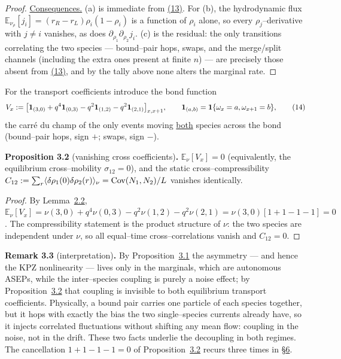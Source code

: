 \documentclass[11pt]{article}
\theoremstyle{plain}
\theoremstyle{definition}
\theoremstyle{remark}
\newcommand{\E}{\mathbb{E}}\newcommand{\PP}{\mathbb{P}}\newcommand{\dd}{\,\mathrm{d}}
\begin{document}
\begin{proof}
\underline{Consequences.} (a) is immediate from \hyperref[eq_jdecouple]{(13)}. For (b), the
hydrodynamic flux $\E_{\nu_\rho}[j_i]=(r_R-r_L)\rho_i(1-\rho_i)$ is a function of
$\rho_i$ alone, so every $\rho_j$--derivative with $j\ne i$ vanishes, as does
$\partial_{\rho_1}\partial_{\rho_2}j_i$. (c) is the residual: the only transitions
correlating the two species --- bound--pair hops, swaps, and the merge/split channels
(including the extra ones present at finite $n$) --- are precisely those absent from
\hyperref[eq_jdecouple]{(13)}, and by the tally above none alters the marginal rate.
\end{proof}

For the transport coefficients introduce the bond function
\label{eq_Vdef}
\begin{equation}
  V_x:=\big[\mathbf 1_{(3,0)}+q^4\mathbf 1_{(0,3)}-q^2\mathbf 1_{(1,2)}-q^2\mathbf 1_{(2,1)}\big]_{x,x+1},
  \qquad \mathbf 1_{(a,b)}=\mathbf 1\{\omega_x=a,\omega_{x+1}=b\},\qquad(14)
\end{equation}
the carr\'e du champ of the only events moving \underline{both} species across the bond
(bound--pair hops, sign $+$; swaps, sign $-$).

\label{prop_cross}\noindent\textbf{Proposition 3.2} (vanishing cross coefficients)\textbf{.} 
$\E_\nu[V_x]=0$ \textup{(}equivalently, the equilibrium cross--mobility
$\sigma_{12}=0$\textup{)}, and the static cross--compressibility
$C_{12}:=\sum_r\langle\delta\rho_1(0)\delta\rho_2(r)\rangle_\nu=\operatorname{Cov}(N_1,N_2)/L$
vanishes identically.
\par
\begin{proof}
By Lemma~\hyperref[lem_db]{2.2},
$\E_\nu[V_x]=\nu(3,0)+q^4\nu(0,3)-q^2\nu(1,2)-q^2\nu(2,1)=\nu(3,0)[1+1-1-1]=0$. The
compressibility statement is the product structure of $\nu$: the two species are
independent under $\nu$, so all equal--time cross--correlations vanish and $C_{12}=0$.
\end{proof}

\label{rem_transport}\noindent\textbf{Remark 3.3} (interpretation)\textbf{.} 
By Proposition~\hyperref[prop_decouple]{3.1} the asymmetry --- and hence the KPZ nonlinearity ---
lives only in the marginals, which are autonomous ASEPs, while the inter--species
coupling is purely a noise effect; by Proposition~\hyperref[prop_cross]{3.2} that coupling is
invisible to both equilibrium transport coefficients. Physically, a bound pair carries
one particle of each species together, but it hops with exactly the bias the two
single--species currents already have, so it injects correlated fluctuations without
shifting any mean flow: coupling in the noise, not in the drift. These two facts
underlie the decoupling in both regimes. The cancellation $1+1-1-1=0$ of
Proposition~\hyperref[prop_cross]{3.2} recurs three times in \S\hyperref[sec_ew]{6}.
\par
\end{document}
